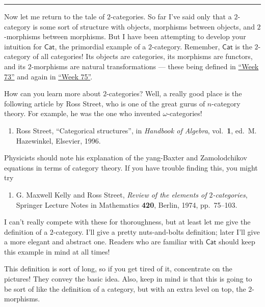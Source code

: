 \documentclass{article}
\def\tightlist{}
\begin{document}
\begin{center}\rule{0.5\linewidth}{0.5pt}\end{center}

Now let me return to the tale of \(2\)-categories. So far I've said only
that a \(2\)-category is some sort of structure with objects, morphisms
between objects, and \(2\)-morphisms between morphisms. But I have been
attempting to develop your intuition for \(\mathsf{Cat}\), the
primordial example of a \(2\)-category. Remember, \(\mathsf{Cat}\) is
the \(2\)-category of all categories! Its objects are categories, its
morphisms are functors, and its \(2\)-morphisms are natural
transformations --- these being defined in
\protect\hyperlink{week73}{``Week 73''} and again in
\protect\hyperlink{week75}{``Week 75''}.

How can you learn more about \(2\)-categories? Well, a really good place
is the following article by Ross Street, who is one of the great gurus
of \(n\)-category theory. For example, he was the one who invented
\(\omega\)-categories!

\begin{enumerate}
\def\labelenumi{\arabic{enumi})}
\setcounter{enumi}{7}
\tightlist
\item
  Ross Street, ``Categorical structures'', in \emph{Handbook of
  Algebra}, vol.~\textbf{1}, ed.~M. Hazewinkel, Elsevier, 1996.
\end{enumerate}

Physicists should note his explanation of the yang-Baxter and
Zamolodchikov equations in terms of category theory. If you have trouble
finding this, you might try

\begin{enumerate}
\def\labelenumi{\arabic{enumi})}
\setcounter{enumi}{8}
\tightlist
\item
  G. Maxwell Kelly and Ross Street, \emph{Review of the elements of
  \(2\)-categories}, Springer Lecture Notes in Mathematics \textbf{420},
  Berlin, 1974, pp.~75--103.
\end{enumerate}

I can't really compete with these for thoroughness, but at least let me
give the definition of a \(2\)-category. I'll give a pretty
nuts-and-bolts definition; later I'll give a more elegant and abstract
one. Readers who are familiar with \(\mathsf{Cat}\) should keep this
example in mind at all times!

This definition is sort of long, so if you get tired of it, concentrate
on the pictures! They convey the basic idea. Also, keep in mind is that
this is going to be sort of like the definition of a category, but with
an extra level on top, the \(2\)-morphisms.
\end{document}
